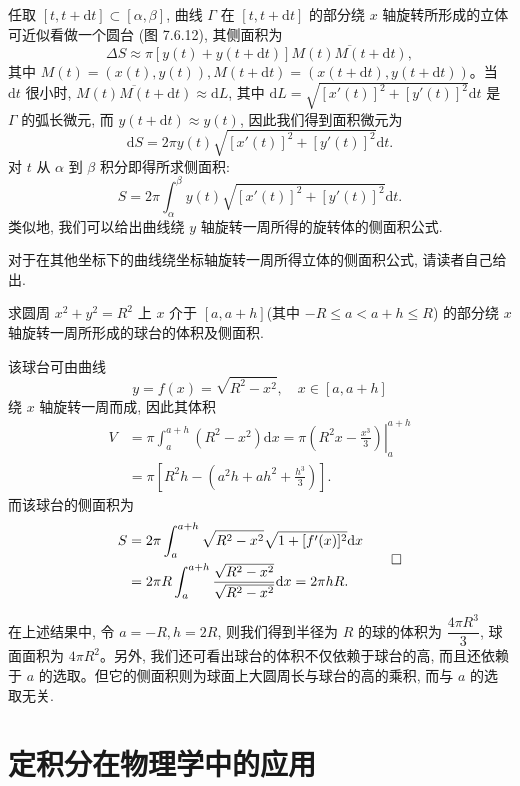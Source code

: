 任取 $[t,t+\mathrm dt]\subset[\alpha,\beta]$, 曲线 $\Gamma$ 在 $[t,t+\mathrm dt]$ 的部分绕 $x$ 轴旋转所形成的立体可近似看做一个圆台 (图 7.6.12), 其侧面积为
\[
  \Delta S\approx\pi[y(t)+y(t+\mathrm dt)]\overline{M(t)M(t+\mathrm dt)},
\]
其中 $M(t)=(x(t),y(t)),M(t+\mathrm dt)=(x(t+\mathrm dt),y(t+\mathrm dt))$。当 $\mathrm dt$ 很小时, $\overline{M(t)M(t+\mathrm dt)}\approx\mathrm dL$, 其中 $\mathrm dL=\sqrt{[x'(t)]^2+[y'(t)]^2}\mathrm dt$ 是 $\Gamma$ 的弧长微元, 而 $y(t+\mathrm dt)\approx y(t)$, 因此我们得到面积微元为
\[
  \mathrm dS=2\pi y(t)\sqrt{[x'(t)]^2+[y'(t)]^2}\mathrm dt.
\]
对 $t$ 从 $\alpha$ 到 $\beta$ 积分即得所求侧面积:
\[
  S=2\pi\int_\alpha^\beta y(t)\sqrt{[x'(t)]^2+[y'(t)]^2}\mathrm dt.
\]
类似地, 我们可以给出曲线绕 $y$ 轴旋转一周所得的旋转体的侧面积公式.

对于在其他坐标下的曲线绕坐标轴旋转一周所得立体的侧面积公式, 请读者自己给出.

\begin{example}\label{example:ma-7-6-10}
求圆周 $x^2+y^2=R^2$ 上 $x$ 介于 $[a,a+h]$(其中 $-R\leq a<a+h\leq R$) 的部分绕 $x$ 轴旋转一周所形成的球台的体积及侧面积.
\end{example}


\begin{solve}
该球台可由曲线
\[
  y=f(x)=\sqrt{R^2-x^2},\quad x\in[a,a+h]
\]
绕 $x$ 轴旋转一周而成, 因此其体积
\[
\begin{aligned}
  V&=\pi\int_a^{a+h}(R^2-x^2)\mathrm dx
  =\left.\pi\left(R^2x-\frac{x^3}{3}\right)\right|_a^{a+h}\\
  &=\pi\left[R^2h-\left(a^2h+ah^2+\frac{h^3}{3}\right)\right].
\end{aligned}
\]
而该球台的侧面积为
\[
\begin{aligned}
  S&=2\pi\int_a^{a+h}\sqrt{R^2-x^2}\sqrt{1+[f'(x)]^2}\mathrm dx\\
  &=2\pi R\int_a^{a+h}\frac{\sqrt{R^2-x^2}}{\sqrt{R^2-x^2}}\mathrm dx
  =2\pi hR.
\end{aligned}
\qedhere
\]
\end{solve}


\begin{remark}\label{remark:ma-7-source-112}
在上述结果中, 令 $a=-R,h=2R$, 则我们得到半径为 $R$ 的球的体积为 $\dfrac{4\pi R^3}{3}$, 球面面积为 $4\pi R^2$。另外, 我们还可看出球台的体积不仅依赖于球台的高, 而且还依赖于 $a$ 的选取。但它的侧面积则为球面上大圆周长与球台的高的乘积, 而与 $a$ 的选取无关.
\end{remark}


\section{定积分在物理学中的应用}
\label{sec:ma-7-7}

